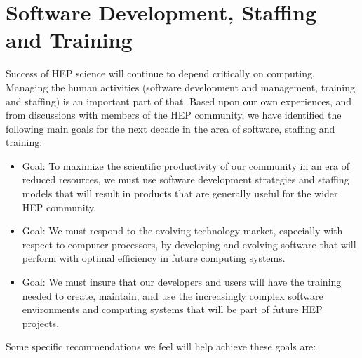 \section{Software Development, Staffing and Training}

Success of HEP science will continue to depend critically on computing.
Managing the human activities (software development and management,
training and staffing) is an important part of that.  
Based upon our own experiences, and from
discussions with members of the HEP community,
we have identified the following main goals for the next decade in the area
of software, staffing and training:

\begin{itemize}
\item Goal: To maximize the scientific productivity of our community
in an era of reduced resources, we must use
software development strategies and staffing models that will result in products
that are generally useful for the wider HEP community.
\item Goal: We must respond to the evolving technology market, especially
with respect to computer processors, by
developing and evolving software that will perform with optimal efficiency
in future computing systems.
\item Goal: We must insure that our developers and users will have the
training needed to create, maintain, and use the increasingly complex software
environments and computing systems that will be part of future HEP projects.
\end{itemize}

Some specific recommendations we feel will help achieve these goals are:

